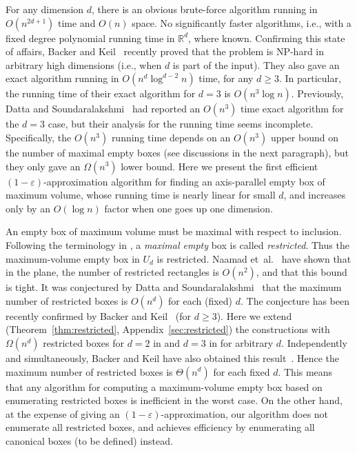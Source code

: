 \documentclass[11pt]{article}
\newcommand{\eps}{\varepsilon}
\newcommand{\RR}{\mathbb{R}}
\begin{document}
For any dimension $d$, there is an obvious brute-force algorithm
running in $O(n^{2d+1})$ time and $O(n)$ space. 
No significantly faster algorithms, i.e., with a fixed degree
polynomial running time in $\RR^d$, where known.
Confirming this state of affairs,
Backer and Keil~\cite{BK09a,BK09b} recently proved that the problem is
NP-hard in arbitrary high dimensions (i.e., when $d$ is part of the input).
They also gave an exact algorithm running in $O(n^d \log^{d-2}{n})$
time, for any $d \geq 3$.  
In particular, the running time of their exact algorithm for $d=3$ is
$O(n^3 \log{n})$. Previously, Datta and Soundaralakshmi~\cite{DS00}
had reported an $O(n^3)$ time exact algorithm for the $d=3$ case, but
their analysis for the running time seems incomplete. Specifically,
the $O(n^3)$ running time depends on an $O(n^3)$ upper bound on the
number of maximal empty boxes (see discussions in the next paragraph),
but they only gave an $\Omega(n^3)$ lower bound.
Here we present the first efficient $(1-\eps)$-approximation algorithm 
for finding an axis-parallel empty box of maximum volume, 
whose running time is nearly linear for small $d$, and increases only
by an $O(\log{n})$ factor when one goes up one dimension. 

An empty box of maximum volume must be maximal with respect to inclusion. 
Following the terminology in \cite{NLH84},
a {\em maximal empty} box is called {\em restricted}. 
Thus the maximum-volume empty box in $U_d$ is restricted.
Naamad et~al.\ \cite{NLH84} have shown that in the plane, the number of 
restricted rectangles is $O(n^2)$, and that this bound is tight.
It was conjectured by Datta and Soundaralakshmi~\cite{DS00} that the
maximum number of restricted boxes is $O(n^{d})$ for each (fixed) $d$.  
The conjecture has been recently confirmed by Backer and
Keil~\cite{BK09a,BK09b} (for $d \geq 3$). 
Here we extend (Theorem~\ref{thm:restricted}, Appendix~\ref{sec:restricted})
the constructions with $\Omega(n^d)$ restricted boxes for $d=2$
in \cite{NLH84} and $d=3$ in \cite{DS00} for arbitrary $d$. 
Independently and simultaneously, Backer and Keil have also obtained
this result~\cite{Ba09,BK09a,BK09b}. Hence the maximum number of restricted
boxes is $\Theta(n^{d})$ for each fixed $d$.   
This means that any algorithm for computing a maximum-volume empty box 
based on enumerating restricted boxes is inefficient in the worst case.
On the other hand, at the expense of giving an $(1-\eps)$-approximation, 
our algorithm does not enumerate all restricted boxes, and
achieves efficiency by enumerating all canonical boxes (to be defined)
instead.  
\end{document}
